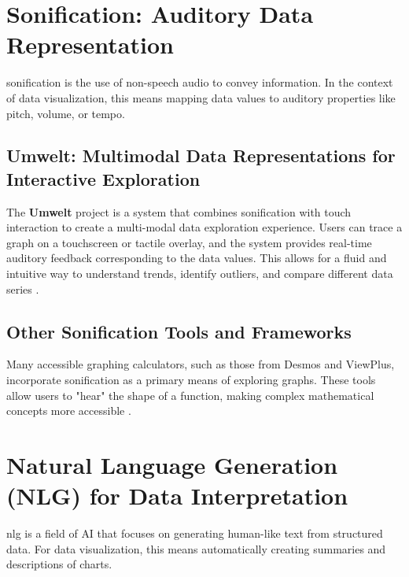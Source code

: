 \section{Sonification: Auditory Data Representation}\label{ch13:sec:sonification}
\gls{sonification} is the use of non-speech audio to convey information. In the context of data visualization, this means mapping data values to auditory properties like pitch, volume, or tempo.

\subsection{Umwelt: Multimodal Data Representations for Interactive Exploration}\label{ch13:ssec:umwelt}
The \textbf{Umwelt} project is a system that combines sonification with touch interaction to create a multi-modal data exploration experience. Users can trace a graph on a touchscreen or tactile overlay, and the system provides real-time auditory feedback corresponding to the data values. This allows for a fluid and intuitive way to understand trends, identify outliers, and compare different data series \supercite{Umwelt, Zong2024Umwelt}.

\subsection{Other Sonification Tools and Frameworks}\label{ch13:ssec:sonification-tools}
Many accessible graphing calculators, such as those from Desmos and ViewPlus, incorporate sonification as a primary means of exploring graphs. These tools allow users to "hear" the shape of a function, making complex mathematical concepts more accessible \supercite{Trayford2023STRAUSS, SonificationSandbox, TwoTone}.

\section{Natural Language Generation (NLG) for Data Interpretation}\label{ch13:sec:nlg}
\gls{nlg} is a field of \gls{AI} that focuses on generating human-like text from structured data. For data visualization, this means automatically creating summaries and descriptions of charts.

